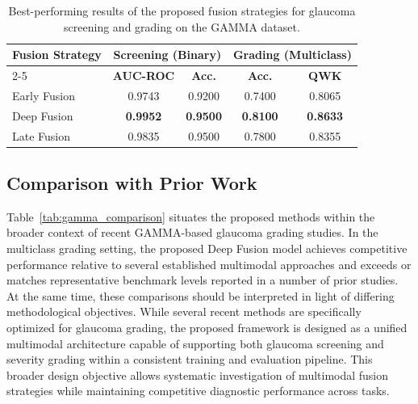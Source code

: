 \documentclass[preprint,12pt]{elsarticle}
\begin{document}
\begin{table}[!t]
    \centering
    \caption{Best-performing results of the proposed fusion strategies for glaucoma screening and grading on the GAMMA dataset.}
    \label{tab:summary_results}
    \scriptsize
    \setlength{\tabcolsep}{5pt}
    \begin{tabular}{lcccc}
        \hline
        \multirow{2}{*}{\textbf{Fusion Strategy}}
                     & \multicolumn{2}{c}{\textbf{Screening (Binary)}}
                     & \multicolumn{2}{c}{\textbf{Grading (Multiclass)}}                                                       \\
        \cline{2-5}
                     & \textbf{AUC-ROC}                                  & \textbf{Acc.}   & \textbf{Acc.}   & \textbf{QWK}    \\
        \hline
        Early Fusion & 0.9743                                            & 0.9200          & 0.7400          & 0.8065          \\
        Deep Fusion  & \textbf{0.9952}                                   & \textbf{0.9500} & \textbf{0.8100} & \textbf{0.8633} \\
        Late Fusion  & 0.9835                                            & 0.9500          & 0.7800          & 0.8355          \\
        \hline
    \end{tabular}
\end{table}


\subsection{Comparison with Prior Work}

Table~\ref{tab:gamma_comparison} situates the proposed methods within the broader context of recent GAMMA-based glaucoma grading studies. In the multiclass grading setting, the proposed Deep Fusion model achieves competitive performance relative to several established multimodal approaches and exceeds or matches representative benchmark levels reported in a number of prior studies. At the same time, these comparisons should be interpreted in light of differing methodological objectives. While several recent methods are specifically optimized for glaucoma grading, the proposed framework is designed as a unified multimodal architecture capable of supporting both glaucoma screening and severity grading within a consistent training and evaluation pipeline. This broader design objective allows systematic investigation of multimodal fusion strategies while maintaining competitive diagnostic performance across tasks.
\end{document}
